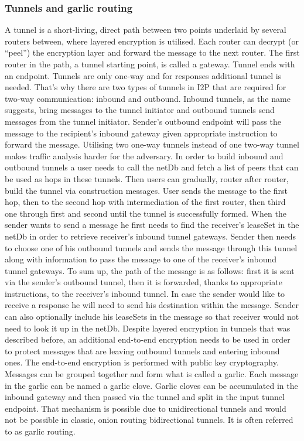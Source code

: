 \subsubsection{Tunnels and garlic routing}
A tunnel is a short-living, direct path between two points underlaid by several routers between, where layered encryption is utilised. Each router can decrypt (or “peel”) the encryption layer and forward the message to the next router. The first router in the path, a tunnel starting point, is called a gateway. Tunnel ends with an endpoint. Tunnels are only one-way and for responses additional tunnel is needed. That’s why there are two types of tunnels in I2P that are required for two-way communication: inbound and outbound. Inbound tunnels, as the name suggests, bring messages to the tunnel initiator and outbound tunnels send messages from the tunnel initiator. Sender’s outbound endpoint will pass the message to the recipient’s inbound gateway given appropriate instruction to forward the message. Utilising two one-way tunnels instead of one two-way tunnel makes traffic analysis harder for the adversary.
In order to build inbound and outbound tunnels a user needs to call the netDb and fetch a list of peers that can be used as hops in these tunnels. Then users can gradually, router after router, build the tunnel via construction messages. User sends the message to the first hop, then to the second hop with intermediation of the first router, then third one through first and second until the tunnel is successfully formed.
When the sender wants to send a message he first needs to find the receiver's leaseSet in the netDb in order to retrieve receiver’s inbound tunnel gateways. Sender then needs to choose one of his outbound tunnels and sends the message through this tunnel along with information to pass the message to one of the receiver’s inbound tunnel gateways. To sum up, the path of the message is as follows: first it is sent via the sender's outbound tunnel, then it is forwarded, thanks to appropriate instructions, to the receiver’s inbound tunnel.
In case the sender would like to receive a response he will need to send his destination within the message. Sender can also optionally include his leaseSets in the message so that receiver would not need to look it up in the netDb.
Despite layered encryption in tunnels that was described before, an additional end-to-end encryption needs to be used in order to protect messages that are leaving outbound tunnels and entering inbound ones. The end-to-end encryption is performed with public key cryptography.
Messages can be grouped together and form what is called a garlic. Each message in the garlic can be named a garlic clove. Garlic cloves can be accumulated in the inbound gateway and then passed via the tunnel and split in the input tunnel endpoint. That mechanism is possible due to unidirectional tunnels and would not be possible in classic, onion routing bidirectional tunnels. It is often referred to as garlic routing.
